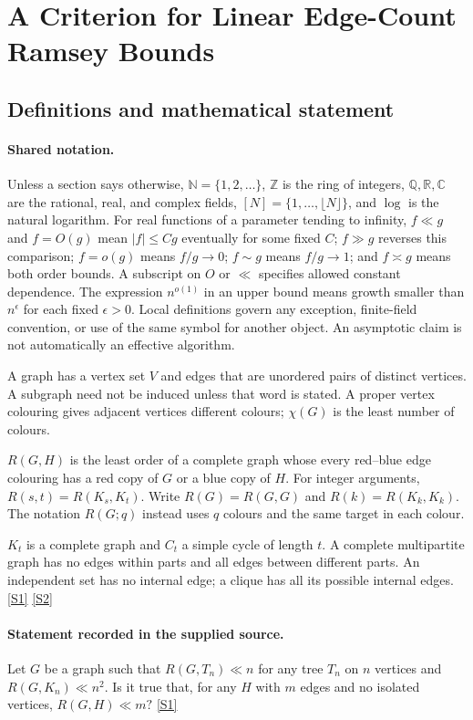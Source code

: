 \documentclass[11pt,a4paper]{article}
\newcommand{\N}{\mathbb{N}}
\newcommand{\Z}{\mathbb{Z}}
\newcommand{\Q}{\mathbb{Q}}
\newcommand{\R}{\mathbb{R}}
\newcommand{\C}{\mathbb{C}}
\newcommand{\sref}[2]{\hyperlink{source:#1:#2}{[S#2]}}
\begin{document}
\section{A Criterion for Linear Edge-Count Ramsey Bounds}\label{statement}


\subsection{Definitions and mathematical statement}

\paragraph{Shared notation.}Unless a section says otherwise, $\N=\{1,2,\ldots\}$,
$\Z$ is the ring of integers, $\Q,\R,\C$ are the rational, real, and complex
fields, $[N]=\{1,\ldots,\lfloor N\rfloor\}$, and $\log$ is the natural
logarithm. For real functions of a parameter tending to infinity,
$f\ll g$ and $f=O(g)$ mean $|f|\leq Cg$ eventually for some fixed $C$;
$f\gg g$ reverses this comparison; $f=o(g)$ means $f/g\to0$;
$f\sim g$ means $f/g\to1$; and $f\asymp g$ means both order bounds.
A subscript on $O$ or $\ll$ specifies allowed constant dependence.
The expression $n^{o(1)}$ in an upper bound means growth smaller than
$n^\epsilon$ for each fixed $\epsilon>0$. Local definitions govern any
exception, finite-field convention, or use of the same symbol for another
object. An asymptotic claim is not automatically an effective algorithm.



A graph has a vertex set $V$ and edges that are unordered pairs of distinct vertices. A subgraph need not be induced unless that word is stated. A proper vertex colouring gives adjacent vertices different colours; $\chi(G)$ is the least number of colours.

$R(G,H)$ is the least order of a complete graph whose every red--blue edge colouring has a red copy of $G$ or a blue copy of $H$. For integer arguments, $R(s,t)=R(K_s,K_t)$. Write $R(G)=R(G,G)$ and $R(k)=R(K_k,K_k)$. The notation $R(G;q)$ instead uses $q$ colours and the same target in each colour.

$K_t$ is a complete graph and $C_t$ a simple cycle of length $t$. A complete multipartite graph has no edges within parts and all edges between different parts. An independent set has no internal edge; a clique has all its possible internal edges. \sref{statement}{1} \sref{statement}{2}

\paragraph{Statement recorded in the supplied source.}
Let $G$ be a graph such that $R(G,T_n)\ll n$ for any tree $T_n$ on $n$ vertices and $R(G,K_n)\ll n^2$. Is it true that, for any $H$ with $m$ edges and no isolated vertices, $ R(G,H)\ll m? $ \sref{statement}{1}
\end{document}
